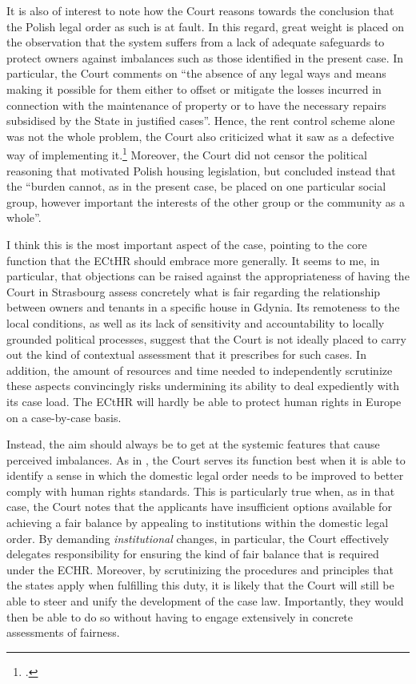 \documentclass[12pt,a4paper]{book} %
\begin{document}
It is also of interest to note how the Court reasons towards the conclusion that the Polish legal order as such is at fault. In this regard, great weight is placed on the observation that the system suffers from a lack of adequate safeguards to protect owners against imbalances such as those identified in the present case. In particular, the Court comments on ``the absence of any legal ways and means making it possible for them either to offset or mitigate the losses incurred in connection with the maintenance of property or to have the necessary repairs subsidised by the State in justified cases''. Hence, the rent control scheme alone was not the whole problem, the Court also criticized what it saw as a defective way of implementing it.\footcite[224]{hutten06} Moreover, the Court did not censor the political reasoning that motivated Polish housing legislation, but concluded instead that the ``burden cannot, as in the present case, be placed on one particular social group, however important the interests of the other group or the community as a whole''. 

I think this is the most important aspect of the case, pointing to the core function that the ECtHR should embrace more generally. It seems to me, in particular, that objections can be raised against the appropriateness of having the Court in Strasbourg assess concretely what is fair regarding the relationship between owners and tenants in a specific house in Gdynia. Its remoteness to the local conditions, as well as its lack of sensitivity and accountability to locally grounded political processes, suggest that the Court is not ideally placed to carry out the kind of contextual assessment that it prescribes for such cases. In addition, the amount of resources and time needed to independently scrutinize these aspects convincingly risks undermining its ability to deal expediently with its case load. The ECtHR will hardly be able to protect human rights in Europe on a case-by-case basis.

Instead, the aim should always be to get at the systemic features that cause perceived imbalances. As in \textcite{hutten06}, the Court serves its function best when it is able to identify a sense in which the domestic legal order needs to be improved to better comply with human rights standards. This is particularly true when, as in that case, the Court notes that the applicants have insufficient options available for achieving a fair balance by appealing to institutions within the domestic legal order. By demanding {\it institutional} changes, in particular, the Court effectively delegates responsibility for ensuring the kind of fair balance that is required under the ECHR. Moreover, by scrutinizing the procedures and principles that the states apply when fulfilling this duty, it is likely that the Court will still be able to steer and unify the development of the case law. Importantly, they would then be able to do so without having to engage extensively in concrete assessments of fairness. 
\end{document}
